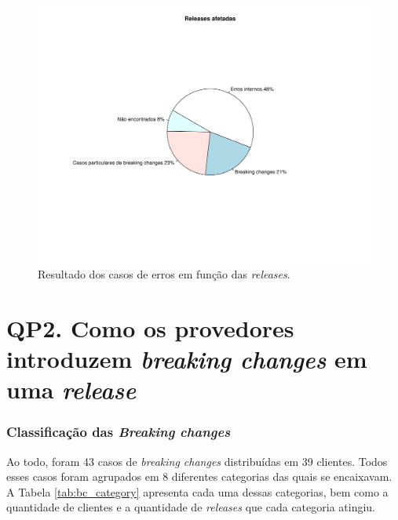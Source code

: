 \begin{figure}
    \centering
    \includegraphics[scale=0.9]{figuras/pre_res_rq1.pdf}
    \caption{Resultado dos casos de erros em função das \textit{releases}.}
    \label{fig:pre_res_rq1}
\end{figure}{}

\section{QP2. Como os provedores introduzem \textit{breaking changes} em uma \textit{release}}
\label{res:qp2}

\subsubsection{\textbf{Classificação das \textit{Breaking changes}}}

Ao todo, foram 43 casos de \textit{breaking changes} distribuídas em 39 clientes. Todos esses casos foram agrupados em 8 diferentes categorias das quais se encaixavam. A Tabela \ref{tab:bc_category} apresenta cada uma dessas categorias, bem como a quantidade de clientes e a quantidade de \textit{releases} que cada categoria atingiu.

